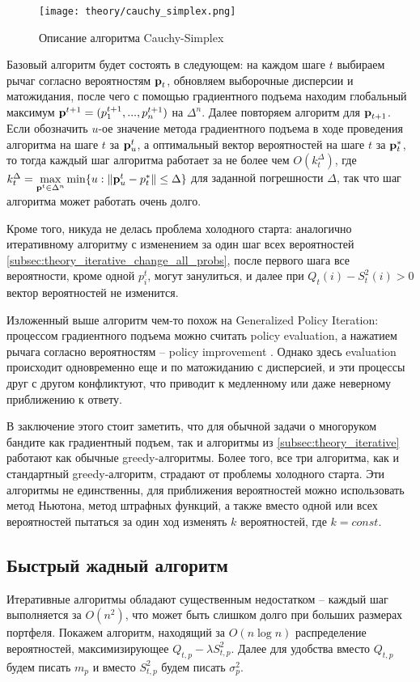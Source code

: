 \begin{figure}[ht!]
    \centering
    \texttt{[image: theory/cauchy\_simplex.png]}
    \caption{Описание алгоритма Cauchy-Simplex}
\label{fig:cauchy_simplex}
\end{figure}

Базовый алгоритм будет состоять в следующем: на каждом шаге $t$ выбираем рычаг согласно вероятностям $\textbf{p}_t$, обновляем выборочные дисперсии и матожидания, после чего с помощью градиентного подъема находим глобальный максимум $\textbf{p}^{t+1} = (p_1^{t+1}, ..., p_n^{t+1})$ на $\Delta^n$. Далее повторяем алгоритм для $\textbf{p}_{t+1}$. Если обозначить $u$-ое значение метода градиентного подъема в ходе проведения алгоритма на шаге $t$ за $\textbf{p}_u^t$, а оптимальный вектор вероятностей на шаге $t$ за $\textbf{p}_t^*$, то тогда каждый шаг алгоритма работает за не более чем $O(k_t^{\Delta})$, где $k_t^{\Delta} = \underset{\textbf{p}^t \in \Delta^n}{\max} \min \{u: \| \textbf{p}_u^t - p_t^* \| \leq \Delta\}$ для заданной погрешности $\Delta$, так что шаг алгоритма может работать очень долго.

Кроме того, никуда не делась проблема холодного старта: аналогично итеративному алгоритму с изменением за один шаг всех вероятностей \ref{subsec:theory_iterative_change_all_probs}, после первого шага все вероятности, кроме одной $p_i^t$, могут занулиться, и далее при $Q_t(i) - S_t^2(i) > 0$ вектор вероятностей не изменится.

Изложенный выше алгоритм чем-то похож на Generalized Policy Iteration: процессом градиентного подъема можно считать policy evaluation, а нажатием рычага согласно вероятностям -- policy improvement \cite{suttonbarto_policy_iteration}. Однако здесь evaluation происходит одновременно еще и по матожиданию с дисперсией, и эти процессы друг с другом конфликтуют, что приводит к медленному или даже неверному приближению к ответу.

В заключение этого стоит заметить, что для обычной задачи о многоруком бандите как градиентный подъем, так и алгоритмы из \ref{subsec:theory_iterative} работают как обычные greedy-алгоритмы. Более того, все три алгоритма, как и стандартный greedy-алгоритм, страдают от проблемы холодного старта. Эти алгоритмы не единственны, для приближения вероятностей можно использовать метод Ньютона, метод штрафных функций, а также вместо одной или всех вероятностей пытаться за один ход изменять $k$ вероятностей, где $k = const$.

\subsection{Быстрый жадный алгоритм}
Итеративные алгоритмы обладают существенным недостатком -- каждый шаг выполняется за $O(n^2)$, что может быть слишком долго при больших размерах портфеля. Покажем алгоритм, находящий за $O(n \log n)$ распределение вероятностей, максимизирующее $Q_{t,p} - \lambda S_{t,p}^2$. Далее для удобства вместо $Q_{t,p}$ будем писать $m_p$ и вместо $S_{t,p}^2$ будем писать $\sigma_p^2$.

